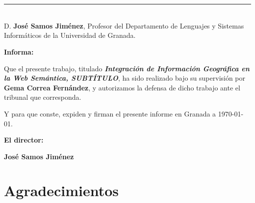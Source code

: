 \chapter*{}
\thispagestyle{empty}

\noindent\rule[-1ex]{\textwidth}{2pt}\\[4.5ex]

D. \textbf{José Samos Jiménez}, Profesor del Departamento de Lenguajes y Sistemas Informáticos de la Universidad de Granada.

\vspace{0.5cm}

\textbf{Informa:}

\vspace{0.5cm}

Que el presente trabajo, titulado \textit{\textbf{Integración de Información Geográfica en la Web Semántica, SUBTÍTULO}},
ha sido realizado bajo su supervisión por \textbf{Gema Correa Fernández}, y autorizamos la defensa de dicho trabajo ante el tribunal que corresponda.

\vspace{0.5cm}

Y para que conste, expiden y firman el presente informe en Granada a \today.

\vspace{1cm}

\textbf{El director:}

\vspace{5cm}

\noindent \textbf{José Samos Jiménez}

\chapter*{Agradecimientos}
\thispagestyle{empty}

       \vspace{1cm}







